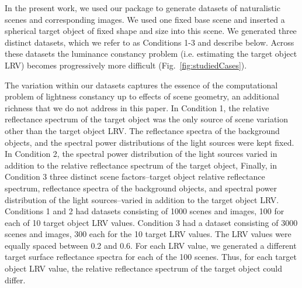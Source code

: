\documentclass{jov}
\begin{document}
In the present work, we used our package to generate datasets of naturalistic scenes and corresponding images.
We used one fixed base scene and inserted a spherical target object of fixed shape and size into this scene.
We generated three distinct datasets, which we refer to as Conditions 1-3 and describe below.
Across these datasets the luminance constancy problem (i.e. estimating the target object LRV)
becomes progressively more difficult (Fig.~\ref{fig:studiedCases}).

The variation within our datasets captures the essence of the computational problem of lightness constancy
up to effects of scene geometry, an additional richness that we do not address in this paper.
In Condition 1, the relative reflectance spectrum of the target object was the only source of scene variation other than the target object LRV.
The reflectance spectra of the background objects, and the spectral power distributions of the light sources were kept fixed.
In Condition 2, the spectral power distribution of the light sources varied in addition to the relative reflectance spectrum of the target object,
Finally, in Condition 3 three distinct scene factors--target object relative reflectance spectrum, reflectance spectra of the background objects, and
spectral power distribution of the light sources--varied in addition to the target object LRV.
Conditions 1 and 2 had datasets consisting of 1000 scenes and images, 100 for each of 10 target object LRV values. 
Condition 3 had a dataset consisting of 3000 scenes and images, 300 each for the 10 target LRV values.
The LRV values were equally spaced between 0.2 and 0.6. For each LRV value, we generated a different target surface reflectance spectra for each of the 100 scenes. Thus, for each target object LRV value, the relative reflectance spectrum of the target object could differ.
\end{document}

